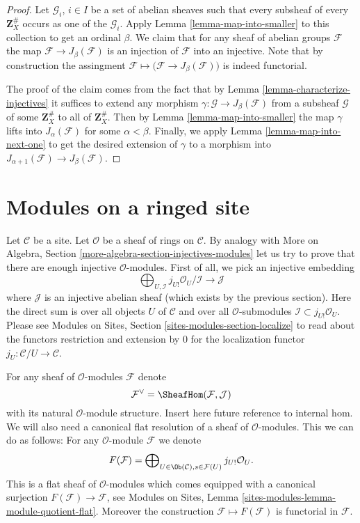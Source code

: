 \begin{proof}
Let $\mathcal{G}_i$, $i \in I$ be a set of abelian
sheaves such that every subsheaf of every $\mathbf{Z}_X^\#$
occurs as one of the $\mathcal{G}_i$. Apply
Lemma \ref{lemma-map-into-smaller} to this collection to
get an ordinal $\beta$. We claim that for any sheaf of abelian
groups $\mathcal{F}$ the map $\mathcal{F} \to J_\beta(\mathcal{F})$
is an injection of $\mathcal{F}$ into an injective.
Note that by construction the assingment
$\mathcal{F} \mapsto \big(\mathcal{F} \to J_\beta(\mathcal{F})\big)$
is indeed functorial.

\medskip\noindent
The proof of the claim comes from the fact that by
Lemma \ref{lemma-characterize-injectives} it suffices to extend any
morphism $\gamma : \mathcal{G} \to J_\beta(\mathcal{F})$
from a subsheaf $\mathcal{G}$ of some $\mathbf{Z}_X^\#$ to all of
$\mathbf{Z}_X^\#$. Then by Lemma \ref{lemma-map-into-smaller} the
map $\gamma$ lifts into $J_\alpha(\mathcal{F})$ for some
$\alpha < \beta$. Finally, we apply Lemma \ref{lemma-map-into-next-one}
to get the desired extension of $\gamma$ to a morphism
into $J_{\alpha + 1}(\mathcal{F}) \to J_\beta(\mathcal{F})$.
\end{proof}






\section{Modules on a ringed site}
\label{section-sheaves-modules}

\noindent
Let $\mathcal{C}$ be a site.
Let $\mathcal{O}$ be a sheaf of rings on $\mathcal{C}$.
By analogy with
More on Algebra, Section \ref{more-algebra-section-injectives-modules}
let us try to prove that there are enough injective
$\mathcal{O}$-modules. First of all, we pick an injective
embedding
$$
\bigoplus\nolimits_{U, \mathcal{I}}
j_{U!}\mathcal{O}_U/\mathcal{I}
\longrightarrow
\mathcal{J}
$$
where $\mathcal{J}$ is an injective abelian sheaf (which
exists by the previous section). Here the direct sum is
over all objects $U$ of $\mathcal{C}$ and over all
$\mathcal{O}$-submodules $\mathcal{I} \subset j_{U!}\mathcal{O}_U$.
Please see
Modules on Sites, Section \ref{sites-modules-section-localize}
to read about the functors restriction and
extension by $0$ for the localization functor
$j_U : \mathcal{C}/U \to \mathcal{C}$.

\medskip\noindent
For any sheaf of $\mathcal{O}$-modules $\mathcal{F}$ denote
$$
\mathcal{F}^\vee
=
\SheafHom(\mathcal{F}, \mathcal{J})
$$
with its natural $\mathcal{O}$-module structure.
Insert here future reference to internal hom.
We will also need
a canonical flat resolution of a sheaf of $\mathcal{O}$-modules.
This we can do as follows: For any $\mathcal{O}$-module
$\mathcal{F}$ we denote
$$
F(\mathcal{F})
=
\bigoplus\nolimits_{U \in \Ob(\mathcal{C}), s \in \mathcal{F}(U)}
j_{U!}\mathcal{O}_U.
$$
This is a flat sheaf of $\mathcal{O}$-modules which comes equipped
with a canonical surjection $F(\mathcal{F}) \to \mathcal{F}$, see
Modules on Sites, Lemma \ref{sites-modules-lemma-module-quotient-flat}.
Moreover the construction $\mathcal{F} \mapsto F(\mathcal{F})$
is functorial in $\mathcal{F}$.

